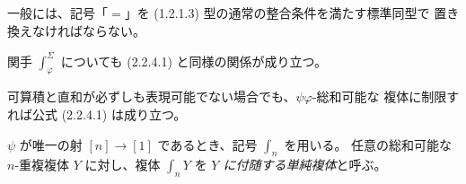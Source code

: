 一般には、記号「$=$」を (1.2.1.3) 型の通常の整合条件を満たす標準同型で
置き換えなければならない。

関手 $\int_{\varphi}^{\Sigma}$ についても (2.2.4.1) と同様の関係が成り立つ。

可算積と直和が必ずしも表現可能でない場合でも、$\psi\varphi$-総和可能な
複体に制限すれば公式 (2.2.4.1) は成り立つ。

$\psi$ が唯一の射 $[n]\to[1]$ であるとき、記号 $\int_n$ を用いる。
任意の総和可能な $n$-重複複体 $Y$ に対し、複体 $\int_nY$ を
\emph{$Y$ に付随する単純複体}と呼ぶ。
